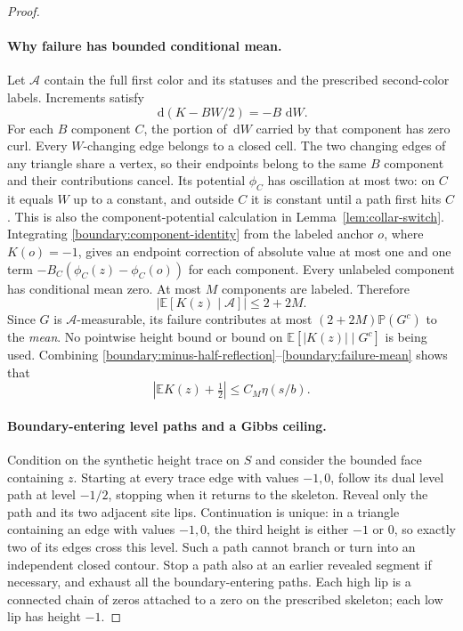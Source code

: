 \documentclass[11pt]{article}
\newcommand{\E}{\mathbb E}
\newcommand{\Prob}{\mathbb P}
\newcommand{\dd}{\,\mathrm d}
\theoremstyle{definition}
\theoremstyle{remark}
\numberwithin{equation}{section}
\begin{document}
\begin{proof}
\paragraph{Why failure has bounded conditional mean.}
Let $\mathcal A$ contain the full first color and its statuses and
the prescribed second-color labels.  Increments satisfy
\begin{equation}
 \dd(K-BW/2)=-B\,\dd W.
 \label{boundary:component-identity}
\end{equation}
For each $B$ component $C$, the portion of $\dd W$ carried by that
component has zero curl.  Every $W$-changing edge belongs to a closed
cell.  The two changing edges of any triangle share a vertex, so
their endpoints belong to the same $B$ component and their
contributions cancel.  Its potential $\phi_C$ has oscillation at most two:
on $C$ it equals $W$ up to a constant, and outside $C$ it is
constant until a path first hits $C$.  This is also the
component-potential calculation in Lemma~\ref{lem:collar-switch}.
Integrating \eqref{boundary:component-identity} from the labeled
anchor $o$, where $K(o)=-1$, gives an endpoint correction of absolute
value at most one and one term
$-B_C(\phi_C(z)-\phi_C(o))$ for each component.  Every unlabeled
component has conditional mean zero.  At most $M$ components are
labeled.  Therefore
\begin{equation}
 \big|\E[K(z)\mid\mathcal A]\big|\le 2+2M.
 \label{boundary:failure-mean}
\end{equation}
Since $G$ is $\mathcal A$-measurable, its failure contributes at most
$(2+2M)\Prob(G^c)$ to the \emph{mean}.  No pointwise height bound or
bound on $\E[|K(z)|\mid G^c]$ is being used.  Combining
\eqref{boundary:minus-half-reflection}--\eqref{boundary:failure-mean}
shows that
\begin{equation}
 \left|\E K(z)+\tfrac12\right|\le C_M\eta(s/b).
 \label{boundary:synthetic-mean}
\end{equation}

\paragraph{Boundary-entering level paths and a Gibbs ceiling.}
Condition on the synthetic height trace on $S$ and consider the
bounded face containing $z$.  Starting at every trace edge with
values $-1,0$, follow its dual level path at level $-1/2$, stopping
when it returns to the skeleton.  Reveal only the path and its two
adjacent site lips.  Continuation is unique: in a triangle containing
an edge with values $-1,0$, the third height is either $-1$ or $0$,
so exactly two of its edges cross this level.  Such a path cannot
branch or turn into an independent closed contour.  Stop a path also
at an earlier revealed segment if necessary, and exhaust all the
boundary-entering paths.  Each high lip is a connected chain of
zeros attached to a zero on the prescribed skeleton; each low lip
has height $-1$.


\end{proof}
\end{document}
